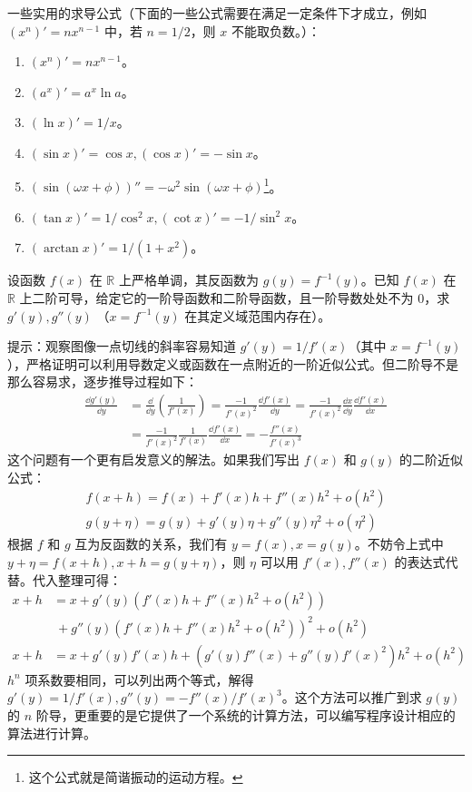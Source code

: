 一些实用的求导公式（下面的一些公式需要在满足一定条件下才成立，例如 $(x^n)'=nx^{n-1}$ 中，若 $n=1/2$，则 $x$ 不能取负数。）：
\begin{enumerate}
\item $(x^n)'=nx^{n-1}$。
\item $(a^x)'=a^x\ln a$。
\item $(\ln x)'=1/x$。
\item $(\sin x)'=\cos x,(\cos x)'=-\sin x$。\item $(\sin(\omega x+\phi))''=-\omega^2\sin(\omega x+\phi)$\footnote{这个公式就是简谐振动的运动方程。}。
\item $(\tan x)'=1/\cos^2 x,(\cot x)'=-1/\sin^2 x$。
\item $(\arctan x)'=1/(1+x^2)$。
\end{enumerate}
\begin{exercise}{}
设函数 $f(x)$ 在 $\mathbb{R}$ 上严格单调，其反函数为 $g(y)=f^{-1}(y)$。已知 $f(x)$ 在 $\mathbb{R}$ 上二阶可导，给定它的一阶导函数和二阶导函数，且一阶导数处处不为 $0$，求 $g'(y),g''(y)$ （$x=f^{-1}(y)$ 在其定义域范围内存在）。

提示：观察图像一点切线的斜率容易知道 $g'(y)=1/f'(x)$（其中 $x=f^{-1}(y)$），严格证明可以利用导数定义或函数在一点附近的一阶近似公式。但二阶导不是那么容易求，逐步推导过程如下：
\begin{equation}
\begin{aligned}
\frac{\dd g'(y)}{\dd y}&=\frac{\dd}{\dd y}\left(\frac{1}{f'(x)}\right)=\frac{-1}{f'(x)^2}\frac{\dd f'(x)}{\dd y}=\frac{-1}{f'(x)^2}\frac{\dd x}{\dd y}\frac{\dd f'(x)}{\dd x}\\
&=\frac{-1}{f'(x)^2}\frac{1}{f'(x)}\frac{\dd f'(x)}{\dd x}=-\frac{f''(x)}{f'(x)^3}
\end{aligned}
\end{equation}
这个问题有一个更有启发意义的解法。如果我们写出 $f(x)$ 和 $g(y)$ 的二阶近似公式：
\begin{equation}
\begin{aligned}
f(x+h)=f(x)+f'(x)h+f''(x)h^2+o(h^2)\\
g(y+\eta)=g(y)+g'(y)\eta+g''(y)\eta^2+o(\eta^2)
\end{aligned}
\end{equation}
根据 $f$ 和 $g$ 互为反函数的关系，我们有 $y=f(x),x=g(y)$。不妨令上式中 $y+\eta=f(x+h),x+h=g(y+\eta)$，则 $\eta$ 可以用 $f'(x),f''(x)$ 的表达式代替。代入整理可得：
\begin{equation}
\begin{aligned}
x+h&=x+g'(y)(f'(x)h+f''(x)h^2+o(h^2))\\
&\ +g''(y)(f'(x)h+f''(x)h^2+o(h^2))^2+o(h^2)\\
x+h&=x+g'(y)f'(x)h + (g'(y)f''(x)+g''(y)f'(x)^2)h^2+o(h^2)
\end{aligned}
\end{equation}
$h^n$ 项系数要相同，可以列出两个等式，解得 $g'(y)=1/f'(x),g''(y)=-f''(x)/f'(x)^3$。这个方法可以推广到求 $g(y)$ 的 $n$ 阶导，更重要的是它提供了一个系统的计算方法，可以编写程序设计相应的算法进行计算。
\end{exercise}